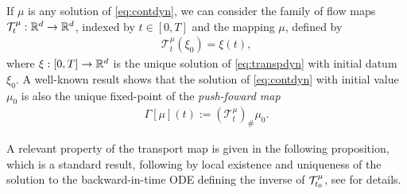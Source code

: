If $\mu$ is any solution of \eqref{eq:contdyn}, we can consider  the family of flow maps $\mathcal{T}^{\mu}_t:\mathbb{R}^d \rightarrow\mathbb{R}^d$, indexed by $t \in [0,T]$ and the mapping $\mu$, defined by
\begin{align*}
\mathcal{T}^{\mu}_t(\xi_0) = \xi(t),
\end{align*}
where $\xi:[0,T]\rightarrow\mathbb{R}^d$ is the unique solution of \eqref{eq:transpdyn} with initial datum $\xi_0$. A well-known result \cite[Theorem 3.10]{CanCarRos10} shows that the solution of \eqref{eq:contdyn} with initial value $\mu_0$ is also the unique fixed-point of the \textit{push-foward map}
\begin{align}\label{eq:fixedpoint}
\Gamma[\mu](t) := (\mathcal{T}^{\mu}_t)_{\#}\mu_0.
\end{align}

{A relevant property of the transport map is given in the following proposition, which is a standard result, following by local existence and uniqueness of the solution to the backward-in-time  ODE defining the inverse of $\mathcal{T}^\mu_{t_0}$, see \cite{bofohama15} for details.}

